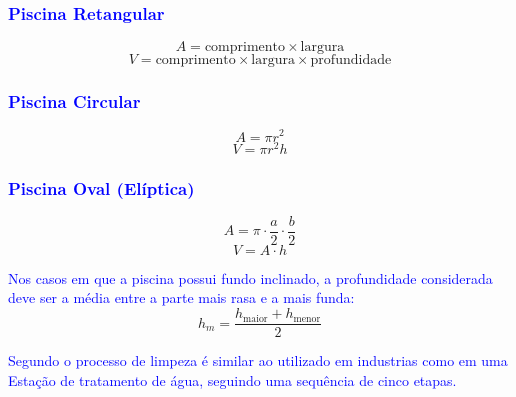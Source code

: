         \subsubsection*{\textcolor{blue}{Piscina Retangular}}
        
            \[
            A = \text{comprimento} \times \text{largura}
            \]
            \[
            V = \text{comprimento} \times \text{largura} \times \text{profundidade}
            \]
            
        \subsubsection*{\textcolor{blue}{Piscina Circular}}
            \[
            A = \pi r^2
            \]
            \[
            V = \pi r^2 h
            \]
            
        \subsubsection*{\textcolor{blue}{Piscina Oval (Elíptica)}}
            \[
            A = \pi \cdot \frac{a}{2} \cdot \frac{b}{2}
            \]
            \[
            V = A \cdot h
            \]
            
            \textcolor{blue}{Nos casos em que a piscina possui fundo inclinado, a profundidade considerada deve ser a média entre a parte mais rasa e a mais funda:}
            \[
            h_m = \frac{h_{\text{maior}} + h_{\text{menor}}}{2}
            \]
            

        \textcolor{blue}{Segundo \cite{tccSilva} o processo de limpeza é similar ao utilizado em industrias como em uma Estação de tratamento de água, seguindo uma sequência de cinco etapas.}


